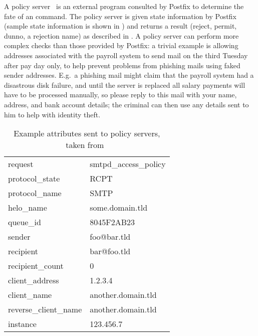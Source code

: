 A policy server~\cite{policy-servers} is an external program consulted by
Postfix to determine the fate of an  command.  The policy
server is given state information by Postfix (sample state information is
shown in ) and returns
a result (reject, permit, dunno, a rejection name) as described in
.  A policy server can
perform more complex checks than those provided by Postfix: a trivial
example is allowing addresses associated with the payroll system to send
mail on the third Tuesday after pay day only, to help prevent problems from
phishing mails using faked sender addresses.  E.g.\ a phishing mail might
claim that the payroll system had a disastrous disk failure, and until the
server is replaced all salary payments will have to be processed manually,
so please reply to this mail with your name, address, and bank account
details; the criminal can then use any details sent to him to help with
identity theft.

\begin{table}[ht]

    \caption{Example attributes sent to policy servers, taken
    from~\cite{policy-servers}}
    \empty{}\label{Example attributes sent to policy servers}

    \centering{}

    \begin{tabular}[]{ll}

        request                 & smtpd\_access\_policy     \\
        protocol\_state         & RCPT                      \\
        protocol\_name          & SMTP                      \\
        helo\_name              & some.domain.tld           \\
        queue\_id               & 8045F2AB23                \\
        sender                  & foo@bar.tld               \\
        recipient               & bar@foo.tld               \\
        recipient\_count        & 0                         \\
        client\_address         & 1.2.3.4                   \\
        client\_name            & another.domain.tld        \\
        reverse\_client\_name   & another.domain.tld        \\
        instance                & 123.456.7                 \\

    \end{tabular}

\end{table}

